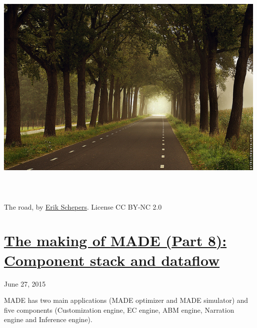 \documentclass[a4paper]{article}
\begin{document}
\href{http://www.velonuboso.com/made/blog/wp-content/uploads/2015/06/15052458077_7c02797819_z.jpg}{
\includegraphics[width=16.986cm,height=11.351cm]{makingofmade113-img8.jpg}
}

The road, by \href{http://www.erikschepers.com/}{Erik Schepers}. License
CC BY-NC 2.0

\bigskip

\clearpage\section[The making of MADE (Part 8): Component stack and
dataflow]{\href{http://www.velonuboso.com/made/2015/06/27/making-part-8-component-stack-dataflow/}{The
making of MADE (Part 8): Component stack and dataflow}}
June 27, 2015

MADE has two main applications (MADE optimizer and MADE simulator) and
five components (Customization engine, EC engine, ABM engine, Narration
engine and Inference engine).
\end{document}
